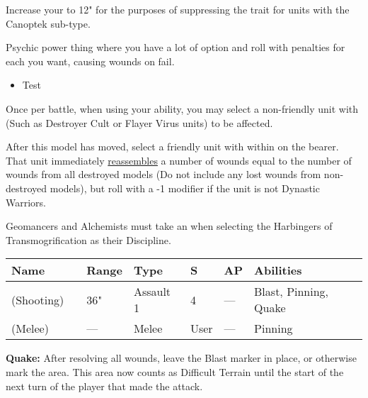 
Increase your  to 12" for the purposes of suppressing the  trait for units with the Canoptek sub-type.


Psychic power thing where you have a lot of option and roll with penalties for each you want, causing wounds on fail.

\begin{itemize}
	\item Test
\end{itemize}


Once per battle, when using your  ability, you may select a non-friendly unit with  (Such as Destroyer Cult or Flayer Virus units) to be affected.

 \label{Rites of Reanimation}

After this model has moved, select a friendly unit with  within  on the bearer. That unit immediately \textcolor{violet}{\hyperref[Reanimation Protocols]{reassembles}} a number of wounds equal to the number of wounds from all destroyed models (Do not include any lost wounds from non-destroyed models), but roll with a -1 modifier if the unit is not Dynastic Warriors.




Geomancers and Alchemists must take an  when selecting the Harbingers of Transmogrification as their Discipline.

\label{Tremorstave}
\noindent
\begin{tabular}{||m{130pt} m{10pt} m{31pt} m{55pt} m{12pt} m{12pt} m{210pt}||}
	\hline
	Name & & Range & Type & S & AP & Abilities \\
	\hline
	\quickref{Tremorstave} (Shooting) & & 36" & Assault 1 & 4 & — & Blast, Pinning, Quake \\
	\quickref{Tremorstave} (Melee) & & — & Melee & User & — & Pinning \\
	\hline
\end{tabular}
\textbf{Quake:} After resolving all wounds, leave the Blast marker in place, or otherwise mark the area. This area now counts as Difficult Terrain until the start of the next turn of the player that made the attack.


